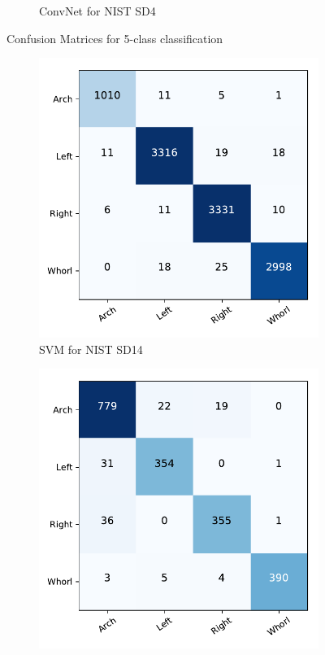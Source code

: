 \begin{figure}[!ht]
\begin{subfigure}[b]{0.25\textwidth}
		\caption{ConvNet for NIST SD4 }
		\label{fig.cnf_matrix_5class.net_sd4}
	\end{subfigure}
	\caption{Confusion Matrices for 5-class classification}\label{fig.cnf_matrix_5class}
\end{figure}

\begin{figure}[!ht]
	\begin{subfigure}[b]{0.25\textwidth}
		\centering
		\includegraphics[width=\linewidth]{fig/figs/confusion_matrix_svm_sd14_4class.pdf}
		\caption{SVM for NIST SD14 }
		\label{fig.cnf_matrix_4class.svm_sd14}
	\end{subfigure}%
	\begin{subfigure}[b]{0.25\textwidth}
		\centering
		\includegraphics[width=\linewidth]{fig/figs/confusion_matrix_svm_sd4_4class_cross_subject.pdf}

\end{subfigure}
\end{figure}
